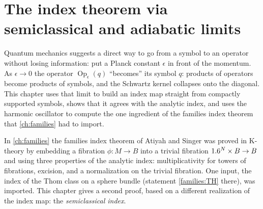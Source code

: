 \chapter{The index theorem via semiclassical and adiabatic limits}\label{ch:semiclassical-index}
\providecommand{\Kc}{K_{\mathrm{c}}}
\providecommand{\inda}{\operatorname{ind}_{\mathrm{a}}}
\providecommand{\indt}{\operatorname{ind}_{\mathrm{t}}}
\providecommand{\Ginf}{G^{-\infty}}
\providecommand{\Ch}{\operatorname{Ch}}
\providecommand{\Td}{\operatorname{Td}}
\providecommand{\Gs}[1]{\Gamma^{#1}}
\providecommand{\Indsl}[1]{\operatorname{Ind}^{#1}_{\mathrm{sl}}}
\providecommand{\indT}{\operatorname{ind}_{\mathcal T}}
\providecommand{\Psisl}[1]{\Psi^{#1}_{\mathrm{sl}}}
\providecommand{\Psiinf}{\Psi^{-\infty}_{\epsilon^\infty}}
\providecommand{\sigsl}{\sigma_{\mathrm{sl}}}
\providecommand{\Ope}{\operatorname{Op}_\epsilon}
\providecommand{\Sc}{\mathcal{S}_{\mathrm c}}
\providecommand{\Torus}{\mathbb{T}}
\providecommand{\Hev}{H^{\mathrm{ev}}}
\providecommand{\Ssl}[1]{S^{#1}_{\mathrm{sl}}}

Quantum mechanics suggests a direct way to go from a symbol to an operator
without losing information: put a Planck constant $\epsilon$ in front of the
momentum. As $\epsilon\to0$ the operator $\Ope(q)$ ``becomes'' its symbol $q$:
products of operators become products of symbols, and the Schwartz kernel
collapses onto the diagonal. This chapter uses that limit to build an index map
straight from compactly supported symbols, shows that it agrees with the analytic
index, and uses the harmonic oscillator to compute the one ingredient of the
families index theorem that \cref{ch:families} had to import.

In \cref{ch:families} the families index theorem of Atiyah and Singer was proved
in K-theory by embedding a fibration $\phi:M\to B$ into a trivial fibration
$1.6^N\times B\to B$ and using three properties of the analytic index:
multiplicativity for towers of fibrations, excision, and a normalization on the
trivial fibration. One input, the index of the Thom class on a sphere bundle
(statement \ref{families:TH} there), was imported. This chapter gives a second proof, based on
a different realization of the index map: the \emph{semiclassical index}.

